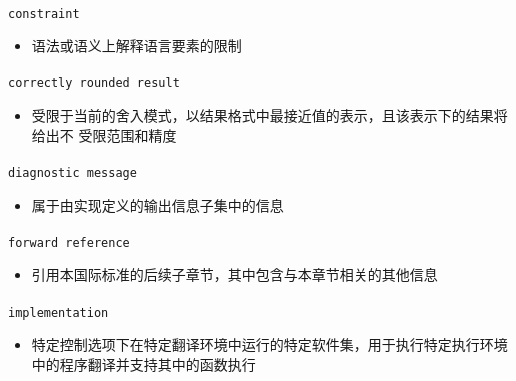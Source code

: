 \paragraph{}
\texttt{constraint}
\begin{itemize}
  \item[]{语法或语义上解释语言要素的限制}
\end{itemize}

\paragraph{}
\texttt{correctly rounded result}
\begin{itemize}
  \item[]{受限于当前的舍入模式，以结果格式中最接近值的表示，且该表示下的结果将给出不
    受限范围和精度}
\end{itemize}

\paragraph{}
\texttt{diagnostic message}
\begin{itemize}
  \item[]{属于由实现定义的输出信息子集中的信息}
\end{itemize}

\paragraph{}
\texttt{forward reference}
\begin{itemize}
  \item[]{引用本国际标准的后续子章节，其中包含与本章节相关的其他信息}
\end{itemize}

\paragraph{}
\texttt{implementation}
\begin{itemize}
  \item[]{特定控制选项下在特定翻译环境中运行的特定软件集，用于执行特定执行环境
    中的程序翻译并支持其中的函数执行}
\end{itemize}


